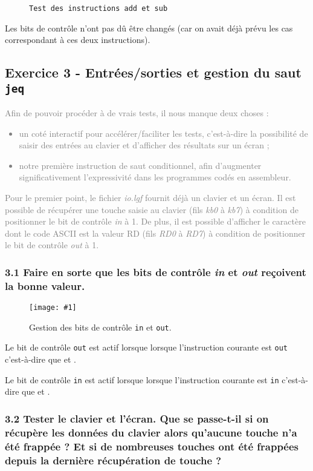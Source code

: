 \documentclass[twoside, 12pt, a4paper]{article}
\newcommand{\cf}[3]{
    \begin{figure}[!h]
        \centering
        \texttt{[image: \#1]}
    \caption{#3}\label{Fig:#1}
    \end{figure}
}
\newcommand{\hcf}[2]{\cf{#1}{.75}{#2}}
\newcommand{\fm}[2]{
\begin{figure}[!h]
    \centering
    \inputminted[]{asm}{#1}
    \caption{\texttt{#2}}
\end{figure}
}
\begin{document}
\fm{../asm/q2_5/add_sub.s}{Test des instructions add et sub}

Les bits de contrôle n'ont pas dû être changés (car on avait déjà prévu les cas correspondant à ces deux instructions).
        
        \clearpage

        \subsection{Exercice 3 - Entrées/sorties et gestion du saut \texttt{jeq}}

\textcolor{gray}{
Afin de pouvoir procéder à de vrais tests, il nous manque deux choses :
\begin{itemize}
    \item un coté interactif pour accélérer/faciliter les tests, c’est-à-dire la possibilité de saisir des
entrées au clavier et d’afficher des résultats sur un écran ;
    \item notre première instruction de saut conditionnel, afin d’augmenter significativement l’expressivité dans les programmes codés en assembleur.
\end{itemize}
Pour le premier point, le fichier \textit{io.lgf} fournit déjà un clavier et un écran. Il est possible de
récupérer une touche saisie au clavier (fils \textit{kb0} à \textit{kb7}) à condition de positionner le bit de contrôle
\textit{in} à 1. De plus, il est possible d’afficher le caractère dont le code ASCII est la valeur RD (fils
\textit{RD0} à \textit{RD7}) à condition de positionner le bit de contrôle \textit{out} à 1.
}

        \subsubsection*{\textbf{3.1} Faire en sorte que les bits de contrôle \textit{in} et \textit{out} reçoivent la bonne valeur.}

\hcf{in_out.png}{Gestion des bits de contrôle \texttt{in} et \texttt{out}.}

Le bit de contrôle \texttt{out} est actif lorsque lorsque l'instruction courante est \texttt{out} c'est-à-dire que
 et .

Le bit de contrôle \texttt{in} est actif lorsque lorsque l'instruction courante est \texttt{in} c'est-à-dire que
 et .

        \subsubsection*{\textbf{3.2} Tester le clavier et l'écran. Que se passe-t-il si on récupère les données du clavier alors qu'aucune touche n'a été frappée ? Et si de nombreuses touches ont été frappées depuis la dernière récupération de touche ?}
\end{document}
